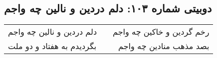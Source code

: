\begin{center}
\section*{دوبیتی شماره ۱۰۳: دلم دردین و نالین چه واجم}
\label{sec:103}
\begin{longtable}{l p{0.5cm} r}
دلم دردین و نالین چه واجم
&&
رخم گردین و خاکین چه واجم
\\
بگردیدم به هفتاد و دو ملت
&&
بصد مذهب منادین چه واجم
\\
\end{longtable}
\end{center}
